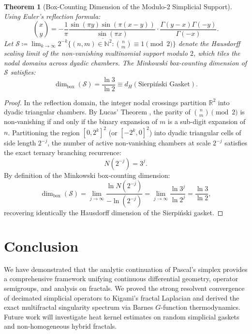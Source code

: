\documentclass[11pt,a4paper]{article}
\theoremstyle{plain}
\newtheorem{theorem}{Theorem}[section]
\theoremstyle{definition}
\theoremstyle{remark}
\numberwithin{equation}{section}
\begin{document}
\begin{theorem}[Box-Counting Dimension of the Modulo-2 Simplicial Support]
Using Euler's reflection formula:
\begin{equation}
\binom{x}{y} = -\frac{1}{\pi}\frac{\sin(\pi y)\sin(\pi(x-y))}{\sin(\pi x)} \cdot \frac{\Gamma(y-x)\Gamma(-y)}{\Gamma(-x)}.
\end{equation}
Let $\mathcal{S} \coloneqq \overline{ \lim_{k\to\infty} 2^{-k} \{(n, m) \in \mathbb{N}^2 : \binom{n}{m} \equiv 1 \pmod 2 \} }$ denote the Hausdorff scaling limit of the non-vanishing multinomial support modulo $2$, which tiles the nodal domains across dyadic chambers. The Minkowski box-counting dimension of $\mathcal{S}$ satisfies:
\begin{equation}
\dim_{\text{box}}(\mathcal{S}) = \frac{\ln 3}{\ln 2} \equiv d_H(\text{Sierpi\'nski Gasket}).
\end{equation}
\end{theorem}

\begin{proof}
In the reflection domain, the integer nodal crossings partition $\mathbb{R}^2$ into dyadic triangular chambers. By Lucas' Theorem \cite{lucas1878}, the parity of $\binom{n}{m} \pmod 2$ is non-vanishing if and only if the binary expansion of $m$ is a sub-digit expansion of $n$. Partitioning the region $[0, 2^k]^2$ (or $[-2^k, 0]^2$) into dyadic triangular cells of side length $2^{-j}$, the number of active non-vanishing chambers at scale $2^{-j}$ satisfies the exact ternary branching recurrence:
\begin{equation}
N(2^{-j}) = 3^j.
\end{equation}
By definition of the Minkowski box-counting dimension:
\begin{equation}
\dim_{\text{box}}(\mathcal{S}) = \lim_{j \to \infty} \frac{\ln N(2^{-j})}{-\ln(2^{-j})} = \lim_{j \to \infty} \frac{\ln 3^j}{\ln 2^j} = \frac{\ln 3}{\ln 2},
\end{equation}
recovering identically the Hausdorff dimension of the Sierpi\'nski gasket.
\end{proof}

\section{Conclusion}

We have demonstrated that the analytic continuation of Pascal's simplex provides a comprehensive framework unifying continuous differential geometry, operator semigroups, and analysis on fractals. We proved the strong resolvent convergence of decimated simplicial operators to Kigami's fractal Laplacian and derived the exact multifractal singularity spectrum via Barnes $G$-function thermodynamics. Future work will investigate heat kernel estimates on random simplicial gaskets and non-homogeneous hybrid fractals.
\end{document}

